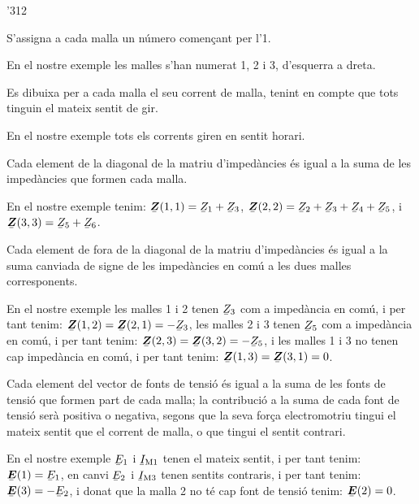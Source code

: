 \begin{dingautolist}{'312}
   \item S'assigna a cada malla un número començant per l'1.

          En el nostre exemple les malles s'han numerat 1, 2 i 3, d'esquerra a dreta.
   \item Es dibuixa per a  cada malla el seu corrent de malla, tenint en compte que tots tinguin el mateix sentit de gir.

       En el nostre exemple tots els corrents giren en sentit horari.
   \item Cada element de la diagonal de la matriu d'impedàncies és igual a la suma de les impedàncies que formen cada malla.

       En el nostre exemple tenim: $\mcmplx{Z}(1,1)=\cmplx{Z}_1 + \cmplx{Z}_3$, $\mcmplx{Z}(2,2)=\cmplx{Z}_2 + \cmplx{Z}_3+ \cmplx{Z}_4+ \cmplx{Z}_5$, i $\mcmplx{Z}(3,3)=\cmplx{Z}_5 + \cmplx{Z}_6$.
   \item Cada element de fora de la diagonal de la matriu d'impedàncies és igual a la suma canviada de signe de les impedàncies en comú a les dues malles corresponents.

        En el nostre exemple les malles 1 i 2 tenen $\cmplx{Z}_3$ com a impedància en comú, i per tant tenim: $\mcmplx{Z}(1,2)=\mcmplx{Z}(2,1)= -\cmplx{Z}_3$, les malles 2 i 3 tenen $\cmplx{Z}_5$ com a impedància en comú, i per tant  tenim: $\mcmplx{Z}(2,3)=\mcmplx{Z}(3,2)= -\cmplx{Z}_5$, i les malles 1 i 3 no tenen cap impedància en comú, i per tant  tenim: $\mcmplx{Z}(1,3)=\mcmplx{Z}(3,1)= 0$.
    \item Cada element del vector de fonts de tensió és igual a la suma de les fonts de tensió que formen part de cada malla; la contribució a la suma de cada font de tensió serà positiva o negativa, segons que la seva força electromotriu tingui el mateix sentit que el corrent de malla, o que  tingui el sentit contrari.

         En el nostre exemple $\cmplx{E}_1$ i $\cmplx{I}\ped{M1}$ tenen el mateix sentit, i per tant tenim:   $\mcmplx{E}(1) = \cmplx{E}_1$, en canvi $\cmplx{E}_2$ i $\cmplx{I}\ped{M3}$ tenen   sentits contraris, i per tant   tenim:   $\mcmplx{E}(3) = -\cmplx{E}_2$, i donat que la malla 2 no té cap font de tensió  tenim:   $\mcmplx{E}(2) = 0$.
\end{dingautolist}

